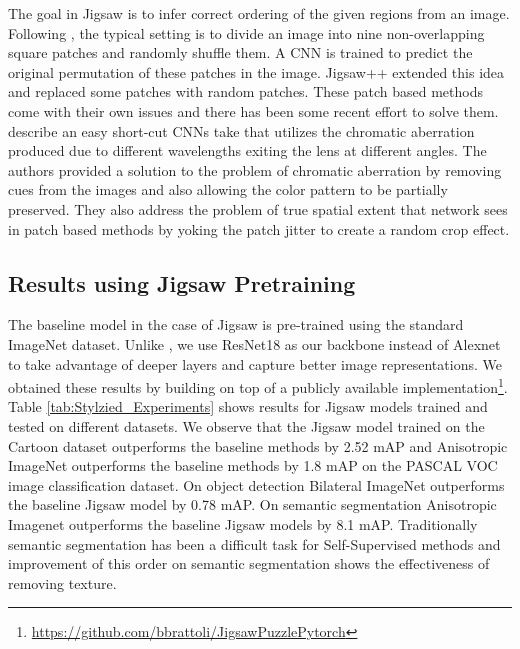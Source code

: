 \documentclass{bmvc2k}
\begin{document}
The goal in Jigsaw is to infer correct ordering of the given regions from an image. Following \cite{Noroozi2016UnsupervisedLO}, the typical setting is to divide an image into nine non-overlapping square patches and randomly shuffle them. A CNN is trained to predict the original permutation of these patches in the image. Jigsaw++ \cite {Noroozi_2018_CVPR} extended this idea and replaced some patches with random patches. These patch based methods come with their own issues and there has been some recent effort to solve them. \cite {Mundhenk2017ImprovementsTC} describe an easy short-cut CNNs take that utilizes the chromatic aberration produced due to different wavelengths exiting the lens at different angles. The authors provided a solution to the problem of chromatic aberration by removing cues from the images and also allowing the color pattern to be partially preserved. They also address the problem of true spatial extent that network sees in patch based methods by yoking the patch jitter to create a random crop effect.

\subsection{Results using Jigsaw Pretraining}

The baseline model in the case of Jigsaw is pre-trained using the standard ImageNet dataset. Unlike \cite{Noroozi2016UnsupervisedLO}, we use ResNet18 as our backbone instead of Alexnet\cite{Krizhevsky2017ImageNetCW} to take advantage of deeper layers and capture better image representations. 
We obtained these results by building on top of a publicly available implementation\footnote{\href{https://github.com/bbrattoli/JigsawPuzzlePytorch}{https://github.com/bbrattoli/JigsawPuzzlePytorch}}.
Table \ref{tab:Stylzied_Experiments} shows results for Jigsaw models trained and tested on different datasets. We observe that the Jigsaw model trained on the Cartoon dataset outperforms the baseline methods by 2.52 mAP and Anisotropic ImageNet outperforms the baseline methods by 1.8 mAP on the PASCAL VOC image classification dataset.
On object detection Bilateral ImageNet outperforms the baseline Jigsaw model by 0.78 mAP. 
On semantic segmentation Anisotropic Imagenet outperforms the baseline Jigsaw models by 8.1 mAP. Traditionally semantic segmentation has been a difficult task for Self-Supervised methods \cite{Noroozi2016UnsupervisedLO,Caron2018DeepCF} and improvement of this order on semantic segmentation shows the effectiveness of removing texture.
\end{document}

